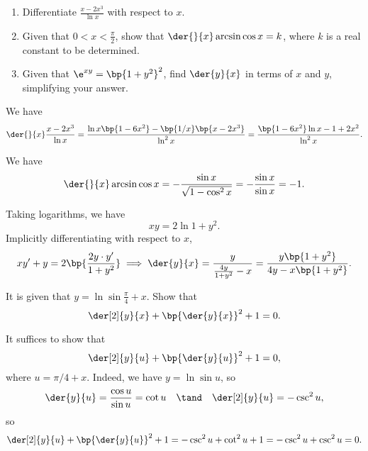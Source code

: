 \begin{problem}
    \begin{enumerate}
        \item Differentiate $\frac{x - 2x^3}{\ln x}$ with respect to $x$.
        \item Given that $0 < x < \frac\pi2$, show that $\der{}{x} \arcsin{\cos x} = k$, where $k$ is a real constant to be determined.
        \item Given that $\e^{xy} = \bp{1 + y^2}^2$, find $\der{y}{x}$ in terms of $x$ and $y$, simplifying your answer.
    \end{enumerate}
\end{problem}
\clearpage
\begin{solution}
    \begin{ppart}
        We have \[\der{}{x} \frac{x - 2x^3}{\ln x} = \frac{\ln x \bp{1 - 6x^2} - \bp{1/x} \bp{x - 2x^3}}{\ln^2 x} = \frac{\bp{1 - 6x^2}\ln x- 1 + 2x^2}{\ln^2 x}.\]
    \end{ppart}
    \begin{ppart}
        We have \[\der{}{x} \arcsin \cos x = -\frac{\sin x}{\sqrt{1 - \cos^2 x}} = -\frac{\sin x}{\sin x} = -1.\]
    \end{ppart}
    \begin{ppart}
        Taking logarithms, we have \[xy = 2 \ln{1 + y^2}.\] Implicitly differentiating with respect to $x$, \[xy' + y = 2\bp{\frac{2y \cdot y'}{1 + y^2}} \implies \der{y}{x} = \frac{y}{\frac{4y}{1+y^2} - x} = \frac{y\bp{1 + y^2}}{4y - x\bp{1 + y^2}}.\]
    \end{ppart}
\end{solution}

\begin{problem}
    It is given that $y = \ln \sin{\frac\pi4 + x}$. Show that \[\der[2]{y}{x} + \bp{\der{y}{x}}^2 + 1 = 0.\]
\end{problem}
\begin{solution}
    It suffices to show that \[\der[2]{y}{u} + \bp{\der{y}{u}}^2 + 1 = 0,\] where $u = \pi/4 + x$. Indeed, we have $y = \ln \sin u$, so \[\der{y}{u} = \frac{\cos u}{\sin u} = \cot u \quad \tand \quad \der[2]{y}{u} = -\csc^2 u,\] so \[\der[2]{y}{u} + \bp{\der{y}{u}}^2 + 1 = -\csc^2 u + \cot^2 u + 1 = -\csc^2 u + \csc^2 u = 0.\]
\end{solution}

